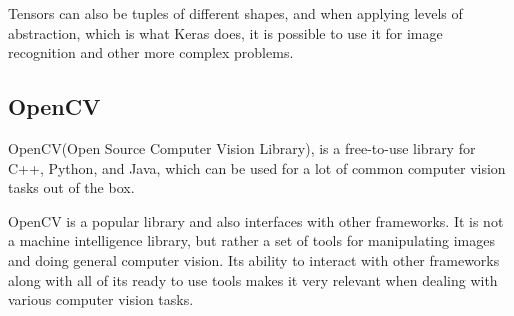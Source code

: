 Tensors can also be tuples of different shapes, and when applying levels of abstraction, which is what Keras does, it is possible to use it for image recognition and other more complex problems.


\subsection{OpenCV}
OpenCV(Open Source Computer Vision Library), is a free-to-use library for C++, Python, and Java, which can be used for a lot of common computer vision tasks out of the box\cite{opencv}.

OpenCV is a popular library and also interfaces with other frameworks.
It is not a machine intelligence library, but rather a set of tools for manipulating images and doing general computer vision.
Its ability to interact with other frameworks along with all of its ready to use tools makes it very relevant when dealing with various computer vision tasks.


